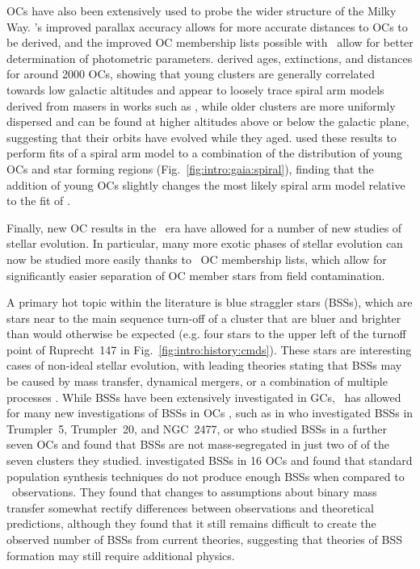 OCs have also been extensively used to probe the wider structure of the Milky Way. \gaia's improved parallax accuracy allows for more accurate distances to OCs to be derived, and the improved OC membership lists possible with \gaia\ allow for better determination of photometric parameters. \cite{cantat-gaudin_painting_2020} derived ages, extinctions, and distances for around 2000 OCs, showing that young clusters are generally correlated towards low galactic altitudes and appear to loosely trace spiral arm models derived from masers in works such as \cite{reid_trigonometric_parallaxes_2014}, while older clusters are more uniformly dispersed and can be found at higher altitudes above or below the galactic plane, suggesting that their orbits have evolved while they aged. \cite{castro-ginard_milky_2021} used these results to perform fits of a spiral arm model to a combination of the distribution of young OCs and star forming regions (Fig.~\ref{fig:intro:gaia:spiral}), finding that the addition of young OCs slightly changes the most likely spiral arm model relative to the fit of \cite{reid_trigonometric_parallaxes_2014}.

Finally, new OC results in the \gaia\ era have allowed for a number of new studies of stellar evolution. In particular, many more exotic phases of stellar evolution can now be studied more easily thanks to \gaia\ OC membership lists, which allow for significantly easier separation of OC member stars from field contamination. 

A primary hot topic within the literature is blue straggler stars (BSSs), which are stars near to the main sequence turn-off of a cluster that are bluer and brighter than would otherwise be expected (e.g. four stars to the upper left of the turnoff point of Ruprecht~147 in Fig.~\ref{fig:intro:history:cmds}). These stars are interesting cases of non-ideal stellar evolution, with leading theories stating that BSSs may be caused by mass transfer, dynamical mergers, or a combination of multiple processes \citep{boffin_ecology_2015}. While BSSs have been extensively investigated in GCs, \gaia\ has allowed for many new investigations of BSSs in OCs \citep{cantat-gaudin_milky_2022}, such as in \cite{rain_blue_2020} who investigated BSSs in Trumpler~5, Trumpler~20, and NGC~2477, or \cite{vaidya_blue_2020} who studied BSSs in a further seven OCs and found that BSSs are not mass-segregated in just two of of the seven clusters they studied. \cite{leiner_census_blue_2021} investigated BSSs in 16 OCs and found that standard population synthesis techniques do not produce enough BSSs when compared to \gaia\ observations. They found that changes to assumptions about binary mass transfer somewhat rectify differences between observations and theoretical predictions, although they found that it still remains difficult to create the observed number of BSSs from current theories, suggesting that theories of BSS formation may still require additional physics.

